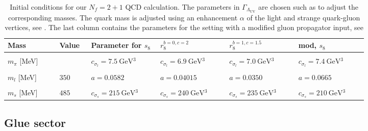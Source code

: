 \documentclass[10pt,prd,superscriptaddress,twocolumn]{revtex4-2}
\begin{document}
%
\begin{table}[t]
	\hspace{-5pt}
	\begin{tabular}{>{\centering}m{0.12\linewidth} ||>{\centering}m{0.06\linewidth}||>{\centering}m{0.16\linewidth}||>{\centering}m{0.16\linewidth}||>{\centering}m{0.16\linewidth}|| >{\centering\arraybackslash}m{0.16\linewidth}}
		Mass & Value & Parameter for $s_8$ & $r_8^{b=0,c=2}$ & $r_8^{b=1,c=1.5}$ & mod, $s_8$\\[1ex]
		\hline&&&&&\\[-2ex]
		$m_{\pi}$ [MeV] &  138 & $c_{\sigma_l} = \qty{7.5}{\GeV^3}$&$c_{\sigma_l} = \qty{6.9}{\GeV^3}$&$c_{\sigma_l} = \qty{7.0}{\GeV^3}$&$c_{\sigma_l} = \qty{7.4}{\GeV^3}$\\[1ex]
		\hline&&&&&\\[-2ex]
		$m_l$ [MeV]      &  $350$ & $a= 0.0582$ & $a= 0.04015$ & $a= 0.0350$ & $a= 0.0665$ \\[1ex]
		\hline&&&&&\\[-2ex] 
		$m_s$ [MeV]      &  $485$ & $c_{\sigma_s} = \qty{215}{\GeV^3}$&$c_{\sigma_s} = \qty{240}{\GeV^3}$&$c_{\sigma_s} = \qty{235}{\GeV^3}$&$c_{\sigma_s} = \qty{210}{\GeV^3}$\\[1ex]
	\end{tabular}
	\vspace{7pt}
	\caption{Initial conditions for our $N_f=2+1$ {QCD} calculation. The parameters in $\Gamma_{\Lambda_\textrm{UV}}$ are chosen such as to adjust the corresponding masses. 
	The quark mass is adjusted using an enhancement $\alpha$ of the light and strange quark-gluon vertices, see \cite{Fu:2019hdw, Ihssen:2024miv}. The last column contains the parameters for the setting with a modified gluon propagator input, see 
		\hspace*{\fill}	
	}
	\label{tab:QCDPD_initial} 		
\end{table}


\subsection{Glue sector}
\label{sec:QCDPD_setup_glue}
\end{document}
